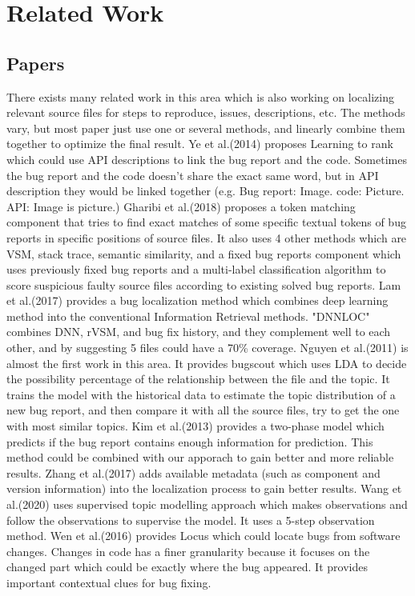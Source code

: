 \documentclass[sigconf]{acmart}
\begin{document}
\section{Related Work}
\subsection{Papers}
There exists many related work in this area which is also working on localizing relevant source files for steps to reproduce, issues, descriptions, etc. The methods vary, but most paper just use one or several methods, and linearly combine them together to optimize the final result. 
Ye et al.(2014)\cite{DBLP:conf/sigsoft/YeBL14} proposes Learning to rank which could use API descriptions to link the bug report and the code. Sometimes the bug report and the code doesn't share the exact same word, but in API description they would be linked together (e.g. Bug report: Image. code: Picture. API: Image is picture.) 
Gharibi et al.(2018)\cite{original} proposes a token matching component that tries to find exact matches of some specific textual tokens of bug reports in specific positions of source files. It also uses 4 other methods which are VSM, stack trace, semantic similarity, and a fixed bug reports component which uses previously fixed bug reports and a multi-label classification algorithm to score suspicious faulty source files according to existing solved bug reports.
Lam et al.(2017)\cite{DBLP:conf/iwpc/LamNNN17} provides a bug localization method which combines deep learning method into the conventional Information Retrieval methods. "DNNLOC" combines DNN, rVSM, and bug fix history, and they complement well to each other, and by suggesting 5 files could have a 70\% coverage.
Nguyen et al.(2011)\cite{DBLP:conf/kbse/NguyenNANN11} is almost the first work in this area. It provides bugscout which uses LDA to decide the possibility percentage of the relationship between the file and the topic. It trains the model with the historical data to estimate the topic distribution of a new bug report, and then compare it with all the source files, try to get the one with most similar topics.
Kim et al.(2013)\cite{DBLP:journals/tse/KimTKZ13} provides a two-phase model which predicts if the bug report contains enough information for prediction. This method could be combined with our apporach to gain better and more reliable results.
Zhang et al.(2017)\cite{DBLP:conf/apsec/ZhangYWXL17} adds available metadata (such as component and version information) into the localization process to gain better results.
Wang et al.(2020)\cite{ae7b863cdd284f08a6fb920e9e036cc6} uses supervised topic modelling approach which makes observations and follow the observations to supervise the model. It uses a 5-step observation method.
Wen et al.(2016)\cite{DBLP:conf/kbse/WenWC16} provides Locus which could locate bugs from software changes. Changes in code has a finer granularity because it focuses on the changed part which could be exactly where the bug appeared. It provides important contextual clues for bug fixing.
\end{document}
